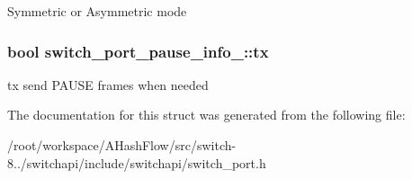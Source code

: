 Symmetric or Asymmetric mode \hypertarget{structswitch__port__pause__info___adbeeee9205cc790f6f3e1acd5063fb19}{
\subsubsection[{tx}]{\setlength{\rightskip}{0pt plus 5cm}bool switch\+\_\+port\+\_\+pause\+\_\+info\+\_\+\+::tx}}\label{structswitch__port__pause__info___adbeeee9205cc790f6f3e1acd5063fb19}
tx send P\+A\+U\+S\+E frames when needed 

The documentation for this struct was generated from the following file\+:\begin{DoxyCompactItemize}
\item 
/root/workspace/\+A\+Hash\+Flow/src/switch-\/8../switchapi/include/switchapi/switch\+\_\+port.\+h\end{DoxyCompactItemize}
